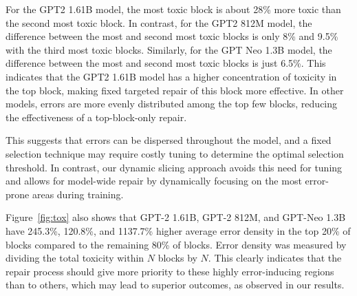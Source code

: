 For the GPT2 1.61B model, the most toxic block is about 28\% more toxic than the second most toxic block. In contrast, for the GPT2 812M model, the difference between the most and second most toxic blocks is only 8\% and 9.5\% with the third most toxic blocks. Similarly, for the GPT Neo 1.3B model, the difference between the most and second most toxic blocks is just 6.5\%. This indicates that the GPT2 1.61B model has a higher concentration of toxicity in the top block, making fixed targeted repair of this block more effective. In other models, errors are more evenly distributed among the top few blocks, reducing the effectiveness of a top-block-only repair.

This suggests that errors can be dispersed throughout the model, and a fixed selection technique may require costly tuning to determine the optimal selection threshold. In contrast, our dynamic slicing approach avoids this need for tuning and allows for model-wide repair by dynamically focusing on the most error-prone areas during training.


Figure~\ref{fig:tox} also shows that GPT-2 1.61B, GPT-2 812M, and GPT-Neo 1.3B have 245.3\%, 120.8\%, and 1137.7\% higher average error density in the top 20\% of blocks compared to the remaining 80\% of blocks. Error density was measured by dividing the total toxicity within \( N \) blocks by \( N \). This clearly indicates that the repair process should give more priority to these highly error-inducing regions than to others, which may lead to superior outcomes, as observed in our results.
















